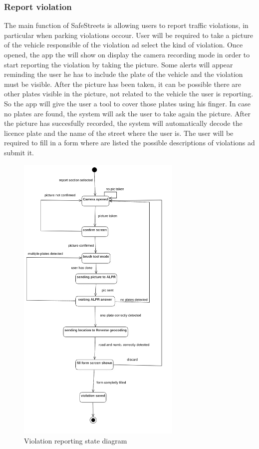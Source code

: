 \subsubsection{Report violation}
The main function of SafeStreets is allowing users to report traffic violations, in particular when parking violations occour. User will be required to take a picture of the vehicle responsible of the violation ad select the kind of violation.
Once opened, the app the will show on display the camera recording mode in order to start reporting the violation by taking the picture. Some alerts will appear reminding the user he has to include the plate of the vehicle and the violation must be visible.
After the picture has been taken, it can be possible there are other plates visible in the picture, not related to the vehicle the user is reporting. So the app will give the user a tool to cover those plates using his finger.
In case no plates are found, the system will ask the user to take again the picture.
After the picture has succesfully recorded, the system will automatically decode the licence plate and the name of the street where the user is.
The user will be required to fill in a form where are listed the possible descriptions of violations ad submit it.

\begin{figure}
\centering
\includegraphics[width=0.7\textwidth]{Images/violationstate.png}
\caption{\label{fig:violationstatediag} Violation reporting state diagram}
\end{figure}

